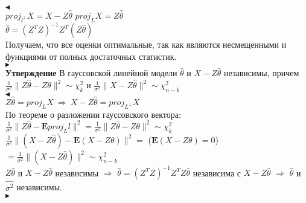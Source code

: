 \documentclass{article}
\begin{document}
$\blacktriangleleft$\\

$proj_{l^\perp}X = X - Z\widehat{\theta}$ $proj_LX = Z\widehat{\theta}$\\

$\widehat{\theta} = (Z^TZ)^{-1}Z^T(Z\widehat{\theta})$\\

Получаем, что все оценки оптимальные, так как являются несмещенными и функциями от полных достаточных статистик.\\

$\blacktriangleright$\\

\textbf{Утверждение} В гауссовской линейной модели $\widehat{\theta}$ и $X - Z\widehat{\theta}$ независимы, причем $\frac{1}{\sigma^2}\|Z\widehat{\theta} - Z\theta\|^2\sim\chi^2_k$ и $\frac{1}{\sigma^2}\|X-Z\widehat{\theta}\|^2\sim\chi^2_{n-k}$\\
$\blacktriangleleft$\\

$Z\widehat{\theta} = proj_LX \ \Rightarrow\ X - Z\widehat{\theta} = proj_{L^\perp}X$\\
По теореме о разложении гауссовского вектора:\\
$\frac{1}{\sigma^2}\|Z\widehat{\theta} - \mathbf{E}proj_Ll\|^2 = \frac{1}{\sigma^2}\|Z\widehat{\theta} - Z\theta\|^2\sim\chi^2_k$\\
$\frac{1}{\sigma^2}\|(X - Z\widehat{\theta}) - \mathbf{E}(X - Z\theta)\|^2 = $ ($\mathbf{E}(X - Z\theta) = 0$) $ = \frac{1}{\sigma^2}\|(X - Z\widehat{\theta})\|^2\sim\chi^2_{n-k}$\\

$Z\widehat{\theta}$ и $X - Z\widehat{\theta}$ независимы $\Rightarrow$ $\widehat{\theta} = (Z^TZ)^{-1}Z^TZ\widehat{\theta}$ независима с $X-Z\widehat{\theta}$ $\Rightarrow$ $\widehat{\theta}$ и $\widehat{\sigma^2}$ независимы.\\

$\blacktriangleright$\\
\end{document}
